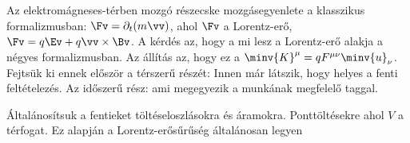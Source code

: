    Az elektromágneses-térben mozgó részecske mozgásegyenlete a klasszikus formalizmusban: $\Fv=\partial_t(m\vv)$, ahol $\Fv$ a Lorentz-erő, $\Fv=q\Ev+q\vv\times\Bv$.
   A kérdés az, hogy a mi lesz a Lorentz-erő alakja a négyes formalizmusban.
   Az állítás az, hogy ez a $\minv{K}^\mu=qF^{\mu\nu}\minv{u}_\nu$.
   Fejtsük ki ennek először a térszerű részét:
   Innen már látszik, hogy helyes a fenti feltételezés.
   Az időszerű rész:
   ami megegyezik a munkának megfelelő taggal. 
   
   Általánosítsuk a fentieket töltéseloszlásokra és áramokra.
   Ponttöltésekre 
   ahol $V$ a térfogat.
   Ez alapján a Lorentz-erősűrűség általánosan legyen 
   
